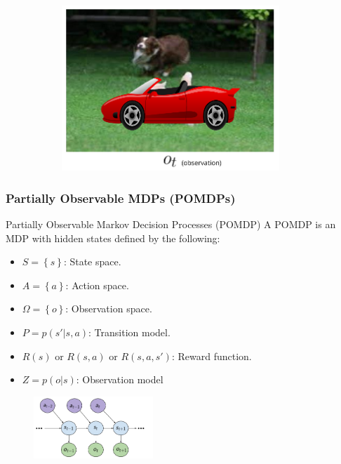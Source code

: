 \begin{frame}
\begin{figure}
\begin{subfigure}{0.3\textwidth}
        \end{subfigure}
        \begin{subfigure}{0.3\textwidth}
            \centering
            \includegraphics[width=0.9\textwidth]{./imgs/img_rl_pomdp_example_3.png}
        \end{subfigure}
    \end{figure}
\end{frame}

\begin{frame}
    \frametitle{Partially Observable MDPs (POMDPs)}
    \begin{block}{Partially Observable Markov Decision Processes (POMDP)}
        A POMDP is an MDP with hidden states defined by the following:
        \begin{itemize}
            \item $S=\left \{ s \right \}$: State space.
            \item $A=\left \{ a \right \}$: Action space.
            \item $\Omega=\left \{ o \right \}$: Observation space.
            \item $P=p(s'|s,a)$: Transition model.
            \item $R(s)$ or $R(s,a)$ or $R(s,a,s')$: Reward function.
            \item $Z=p(o|s)$: Observation model
        \end{itemize}
    \end{block}

    \pause

    \begin{figure}
        \centering
        \includegraphics[width=0.4\textwidth]{./imgs/img_rl_pomdp_graphical_model.png}
    \end{figure}
\end{frame}

